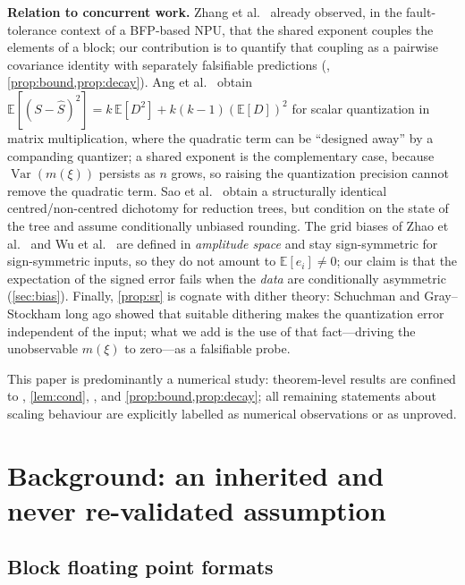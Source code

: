 \documentclass[twocolumn,review,hidelinks,oneeqnum,onetabnum,onefignum,onethmnum]{siamart251216}
\begin{document}
\medskip
\noindent\textbf{Relation to concurrent work.} Zhang et al.\
\cite{zhang2026bfp} already observed, in the fault-tolerance context of a
BFP-based NPU, that the shared exponent couples the elements of a block; our
contribution is to quantify that coupling as a pairwise covariance identity with
separately falsifiable predictions
(, \cref{prop:bound,prop:decay}). Ang et
al.\ \cite{ang2026quant} obtain
$\mathbb{E}[(S-\hat S)^2]=k\,\mathbb{E}[D^2]+k(k-1)(\mathbb{E}[D])^2$ for scalar
quantization in matrix multiplication, where the quadratic term can be ``designed
away'' by a companding quantizer; a shared exponent is the complementary case,
because $\operatorname{Var}(m(\xi))$ persists as $n$ grows, so raising the
quantization precision cannot remove the quadratic term. Sao et
al.\ \cite{sao2026trees} obtain a structurally identical centred/non-centred
dichotomy for reduction trees, but condition on the state of the tree and assume
conditionally unbiased rounding. The grid biases of Zhao et al.\
\cite{zhao2026shrinkage} and Wu et al.\ \cite{wu2026mxfp4} are defined in
\emph{amplitude space} and stay sign-symmetric for sign-symmetric inputs, so they
do not amount to $\mathbb{E}[e_i]\ne0$; our claim is that the expectation of the
signed error fails when the \emph{data} are conditionally asymmetric
(\cref{sec:bias}). Finally, \cref{prop:sr} is cognate with dither theory:
Schuchman \cite{schuchman1964} and Gray--Stockham \cite{gray1993dithered} long
ago showed that suitable dithering makes the quantization error independent of
the input; what we add is the use of that fact---driving the unobservable
$m(\xi)$ to zero---as a falsifiable probe.

\noindent This paper is predominantly a numerical study: theorem-level results
are confined to , \cref{lem:cond},
\crefrange{cor:bounds}{cor:srvar}, and \cref{prop:bound,prop:decay}; all
remaining statements about scaling behaviour are explicitly labelled as numerical
observations or as unproved.

\section{Background: an inherited and never re-validated assumption}
\label{sec:background}

\subsection{Block floating point formats}
\end{document}

